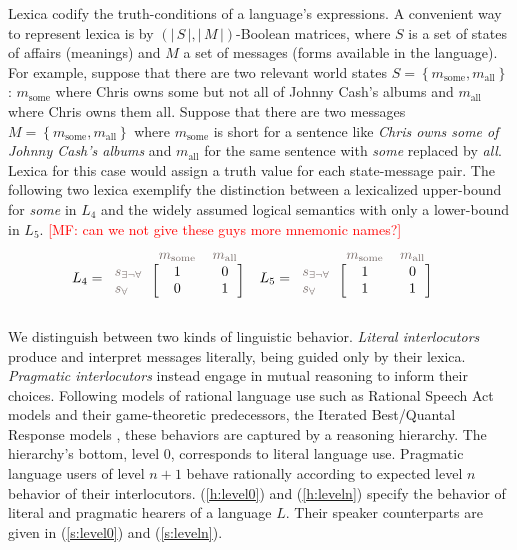 \documentclass[a4paper]{article}
\newcommand{\mf}[1]{\textcolor{Red}{[MF: #1]}}
\newcommand{\set}[1]{\left\{#1\right\}}
\newcommand{\card}[1]{\left \lvert \, #1 \, \right\rvert}
\newcommand{\States}{\ensuremath{S}\xspace}		%
\newcommand{\state}{\ensuremath{s}\xspace}		%
\newcommand{\mystate}[1]{\ensuremath{\state_{\text{#1}}}\xspace} %
\newcommand{\Messgs}{\ensuremath{M}\xspace}		%
\newcommand{\messg}{\ensuremath{m}\xspace}		%
\newcommand{\mymessg}[1]{\ensuremath{\messg_{\text{#1}}}\xspace} %
\newcommand{\ssome}{\mystate{\ensuremath{\exists\neg\forall}}}
\newcommand{\sall}{\mystate{\ensuremath{\forall}}}
\newcommand{\msome}{\mymessg{some}}
\newcommand{\mall}{\mymessg{all}}
\newcommand{\mygray}[1]{{\textcolor{mygray}{#1}}}
\begin{document}
Lexica codify the truth-conditions of a language's expressions. A convenient way to represent
lexica is by $(\card{\States}, \card{\Messgs})$-Boolean matrices, where $\States$ is a set of
states of affairs (meanings) and $M$ a set of messages (forms available in the language). For
example, suppose that there are two relevant world states $\States = \set{\msome, \mall}$:
$\msome$ where Chris owns some but not all of Johnny Cash's albums and $\mall$ where Chris owns
them all. Suppose that there are two messages $\Messgs = \set{\msome, \mall}$ where $\msome$ is
short for a sentence like \emph{Chris owns some of Johnny Cash's albums} and $\mall$ for the
same sentence with \emph{some} replaced by \emph{all}. Lexica for this case would assign a
truth value for each state-message pair. The following two lexica exemplify the distinction
between a lexicalized upper-bound for \emph{some} in $L_4$ and the widely assumed logical
semantics with only a lower-bound in $L_5$. \mf{can we not give these guys more mnemonic names?}
\begin{align*}
  L_{4} & = \begin{blockarray}{lcc}
    & \mygray{\msome} & \mygray{\mall} \\
    \begin{block}{l[cc]}
      \mygray{\ssome} & 1 & 0 \\
      \mygray{\sall}  & 0 & 1 \\
    \end{block}
  \end{blockarray} &
  L_{5} & = \begin{blockarray}{lcc}
    & \mygray{\msome} & \mygray{\mall} \\
    \begin{block}{l[cc]}
      \mygray{\ssome} & 1 & 0 \\
      \mygray{\sall}  & 1 & 1 \\
    \end{block}
  \end{blockarray}
\end{align*}



We distinguish between two kinds of linguistic behavior. {\em Literal interlocutors} produce
and interpret messages literally, being guided only by their lexica. {\em Pragmatic
  interlocutors} instead engage in mutual reasoning to inform their choices. Following models
of rational language use such as Rational Speech Act models \citep{frank+goodman:2012} and
their game-theoretic predecessors, the Iterated Best/Quantal Response models
\citep{franke:2009,franke+jaeger:2014}, these behaviors are captured by a reasoning
hierarchy. The hierarchy's bottom, level $0$, corresponds to literal language use. Pragmatic
language users of level $n + 1$ behave rationally according to expected level $n$ behavior of
their interlocutors. (\ref{h:level0}) and (\ref{h:leveln}) specify the behavior of literal and
pragmatic hearers of a language $L$. Their speaker counterparts are given in (\ref{s:level0})
and (\ref{s:leveln}).
\end{document}
